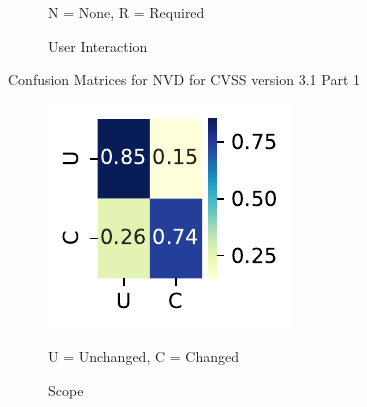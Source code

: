 \documentclass[12pt]{article}
\begin{document}
\begin{figure}
\begin{subfigure}[b]{0.45\textwidth}
		\caption{User Interaction}
		\begin{tablenotes}
			\footnotesize
			\item \quad N = None, R = Required
		\end{tablenotes}
	\end{subfigure}

	\caption{\label{fig:mitre_31_confusion_matrices_1}Confusion Matrices for NVD for CVSS version 3.1 Part 1}
\end{figure}

\begin{figure}
	\centering

	\vspace{1em}

	\begin{subfigure}[b]{0.45\textwidth}
		\includegraphics[width=\textwidth]{./figures/confusion_matrices/scope_mitre.pdf}
		\caption{Scope}
		\begin{tablenotes}
			\footnotesize
			\item \quad U = Unchanged, C = Changed
		\end{tablenotes}
	\end{subfigure}
	\hfill
	\begin{subfigure}[b]{0.45\textwidth}

\end{subfigure}
\end{figure}
\end{document}
